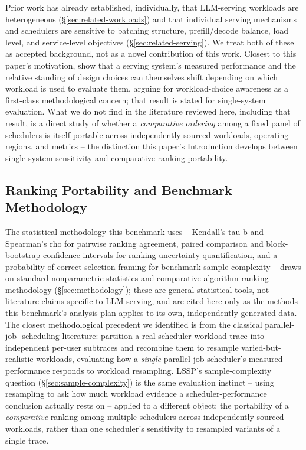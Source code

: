 Prior work has already established, individually, that LLM-serving
workloads are heterogeneous (\S\ref{sec:related-workloads}) and that
individual serving mechanisms and schedulers are sensitive to batching
structure, prefill/decode balance, load level, and service-level
objectives (\S\ref{sec:related-serving}). We treat both of these as accepted
background, not as a novel contribution of this work. Closest to this
paper's motivation, \citet{papaioannou2024workload} show that a serving
system's measured performance and the relative standing of design choices
can themselves shift depending on which workload is used to evaluate them,
arguing for workload-choice awareness as a first-class methodological
concern; that result is stated for single-system evaluation. What we do not
find in the literature reviewed here, including that result, is a direct
study of whether a
\emph{comparative ordering} among a fixed panel of schedulers is itself
portable across independently sourced workloads, operating regions, and
metrics -- the distinction this paper's Introduction develops between
single-system sensitivity and comparative-ranking portability.

\subsection{Ranking Portability and Benchmark Methodology}
\label{sec:related-methodology}

The statistical methodology this benchmark uses -- Kendall's tau-b and
Spearman's rho for pairwise ranking agreement, paired comparison and
block-bootstrap confidence intervals for ranking-uncertainty
quantification, and a probability-of-correct-selection framing for
benchmark sample complexity -- draws on standard nonparametric statistics
and comparative-algorithm-ranking methodology (\S\ref{sec:methodology});
these are general statistical tools, not literature claims specific to LLM
serving, and are cited here only as the methods this benchmark's analysis
plan applies to its own, independently generated data. The closest
methodological precedent we identified is from the classical parallel-job-
scheduling literature: \citet{zakay2014resampling} partition a real
scheduler workload trace into independent per-user subtraces and recombine
them to resample varied-but-realistic workloads, evaluating how a
\emph{single} parallel job scheduler's measured performance responds to
workload resampling. LSSP's sample-complexity question
(\S\ref{sec:sample-complexity}) is the same evaluation instinct --
using resampling to ask how much workload evidence a scheduler-performance
conclusion actually rests on -- applied to a different object: the
portability of a \emph{comparative} ranking among multiple schedulers
across independently sourced workloads, rather than one scheduler's
sensitivity to resampled variants of a single trace.

